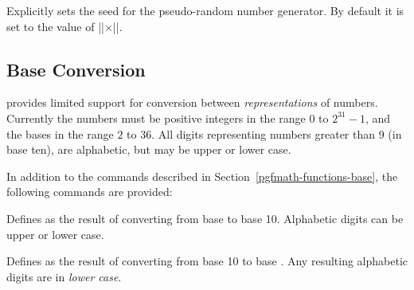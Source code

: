 \begin{command}{\pgfmathsetseed{}}
    Explicitly sets the seed for the pseudo-random number generator. By default
    it is set to the value of |\time|$\times$|\year|.
\end{command}


\subsection{Base Conversion}
\label{pgfmath-bases}

\pgfname{} provides limited support for conversion between
\emph{representations} of numbers. Currently the numbers must be positive
integers in the range $0$ to $2^{31}-1$, and the bases in the range $2$ to
$36$. All digits representing numbers greater than 9 (in base ten), are
alphabetic, but may be upper or lower case.

In addition to the commands described in Section~\ref{pgfmath-functions-base},
the following commands are provided:

\begin{command}{\pgfmathbasetodec{}}
    Defines  as the result of converting  from base
     to base 10. Alphabetic digits can be upper or lower case.

\medskip
\end{command}

\begin{command}{\pgfmathdectobase{}}
    Defines  as the result of converting  from base 10
    to base . Any resulting alphabetic digits are in \emph{lower
    case}.
\begin{codeexample}[]
\pgfmathdectobase{} \mynumber
\end{codeexample}
\end{command}

